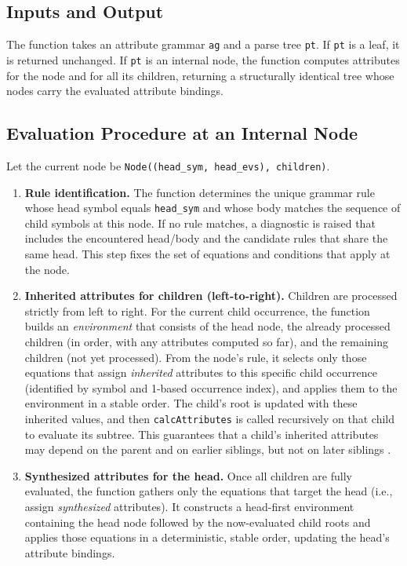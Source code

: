 \subsection{Inputs and Output}
The function takes an attribute grammar \texttt{ag} and a parse tree \texttt{pt}. If \texttt{pt} is a leaf, it is returned unchanged. 
If \texttt{pt} is an internal node, the function computes attributes for the node and for all its children, returning a structurally identical tree
whose nodes carry the evaluated attribute bindings. 

\subsection{Evaluation Procedure at an Internal Node}
Let the current node be \texttt{Node((head\_sym, head\_evs), children)}.
\begin{enumerate}
  \item \textbf{Rule identification.} The function determines the unique grammar rule whose head symbol equals \texttt{head\_sym} and whose body matches the 
sequence of child symbols at this node. If no rule matches, a diagnostic is raised that includes the encountered head/body and the candidate rules 
that share the same head. This step fixes the set of equations and conditions that apply at the node. 

  \item \textbf{Inherited attributes for children (left-to-right).} Children are processed strictly from left to right. For the current child occurrence, 
the function builds an \emph{environment} that consists of the head node, the already processed children (in order, with any attributes computed so far), 
and the remaining children (not yet processed). From the node's rule, it selects only those equations that assign \emph{inherited} attributes to this specific 
child occurrence (identified by symbol and 1-based occurrence index), and applies them to the environment in a stable order. The child's root is updated with these inherited 
values, and then \texttt{calcAttributes} is called recursively on that child to evaluate its subtree. This guarantees that a child's inherited attributes may depend on the parent 
and on earlier siblings, but not on later siblings \cite{AhoSethiUllman1986}. 

  \item \textbf{Synthesized attributes for the head.} Once all children are fully evaluated, the function gathers only the equations that target the head 
(i.e., assign \emph{synthesized} attributes). It constructs a head-first environment containing the head node followed by the now-evaluated child roots and 
applies those equations in a deterministic, stable order, updating the head's attribute bindings. 


\end{enumerate}
